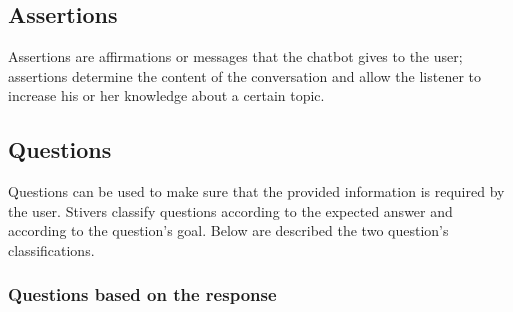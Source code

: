 \documentclass[a4paper,10pt]{article}
\begin{document}

\subsection{Assertions}
Assertions are affirmations or messages that the chatbot gives to the user; assertions determine the content of the conversation and allow the listener to increase his or her knowledge about a certain topic. 

\subsection{Questions}
Questions can be used to make sure that the provided information is required by the user. Stivers \cite{stivers2010overview} classify questions according to the expected answer and according to the question's goal. Below are described the two question's classifications. 

\subsubsection{Questions based on the response}
\end{document}
